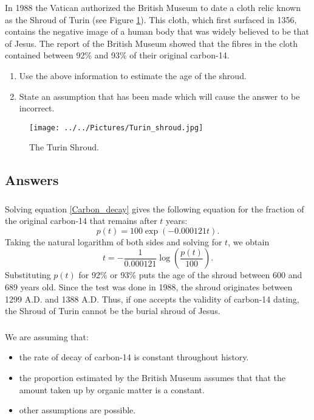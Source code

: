 \documentclass[10pt]{article}
\newcommand{\bb}{\begin{equation}}
\newcommand{\ee}{\end{equation}}
\newcommand{\see}[1]{(see Figure \ref{#1})}
\newcommand{\eqn}[1]{equation \eqref{#1}}
\renewcommand{\l}{\left(}
\renewcommand{\r}{\right)}
\begin{document}
In 1988 the Vatican authorized the British Museum to date a cloth relic known as the Shroud of Turin \see{Turing_shroud}. This cloth, which first surfaced in 1356, contains the negative image of a human body that was widely believed to be that of Jesus. The report of the British Museum showed that the fibres in the cloth contained between 92\% and 93\% of their original carbon-14.
\begin{enumerate}
\item Use the above information to estimate the age of the shroud.
\item State an assumption that has been made which will cause the answer to be incorrect.
\end{enumerate}
\begin{figure}[h!!!tb]
\centering
\texttt{[image: ../../Pictures/Turin\_shroud.jpg]}
\caption{\label{Turing_shroud} The Turin Shroud.}
\end{figure}
\begin{Answ}
\subsection{Answers}
\subsubsection{}
Solving \eqn{Carbon_decay} gives the following equation for the fraction of the original carbon-14 that remains after $t$ years:
\bb
p(t)=100\exp(-0.000121 t).
\ee
Taking the natural logarithm of both sides and solving for $t$, we obtain
\bb
t = -\frac{1}{0.000121}\log\l \frac{p(t)}{100}\r.
\ee
Substituting $p(t)$ for 92\% or 93\% puts the age of the shroud between 600 and 689 years old. Since the test was done in 1988, the shroud originates between 1299 A.D. and 1388 A.D. Thus, if one accepts the validity of carbon-14 dating, the Shroud of Turin cannot be the burial shroud of Jesus.
\subsubsection{}
We are assuming that:
\begin{itemize}
\item the rate of decay of carbon-14 is constant throughout history.
\item the proportion estimated by the British Museum assumes that that the amount taken up by organic matter is a constant.
\item other assumptions are possible.
\end{itemize}
\end{Answ}
\end{document}
